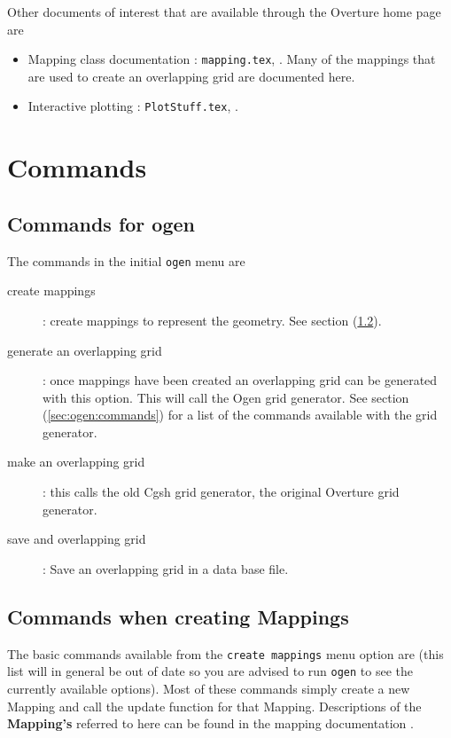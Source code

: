 \documentclass[xcolor=rgb,svgnames,dvipsnames]{article}
\begin{document}
\noindent
Other documents of interest that are available through the Overture home page are
\begin{itemize}
\item Mapping class documentation : {\tt mapping.tex}, \cite{MAPPINGS}. Many of the mappings that
   are used to create an overlapping grid are documented here. 
\item Interactive plotting : {\tt PlotStuff.tex}, \cite{PLOTSTUFF}.
\end{itemize}


\section{Commands}

\subsection{Commands for ogen}

The commands in the initial {\tt ogen} menu  are
\begin{description}
  \item[create mappings] : create mappings to represent the geometry. See section (\ref{sec:createMappings}).
  \item[generate an overlapping grid] : once mappings have been created an overlapping grid
    can be generated with this option. This will call the Ogen grid generator. See section 
       (\ref{sec:ogen:commands}) for a list of the commands available with the grid generator.
  \item[make an overlapping grid] : this calls the old Cgsh grid generator, the original Overture
     grid generator.
  \item[save and overlapping grid] : Save an overlapping grid in a data base file.
\end{description}

\subsection{Commands when creating Mappings} \label{sec:createMappings}

The basic commands available from the {\tt create mappings} menu option are (this list will in general
be out of date so you are advised to run {\tt ogen} to see the currently available options). 
Most of these commands simply create a new Mapping and call the update function for that Mapping.
Descriptions of the {\bf Mapping's} referred to here can be found in the mapping documentation
\cite{MAPPINGS}.
\end{document}
